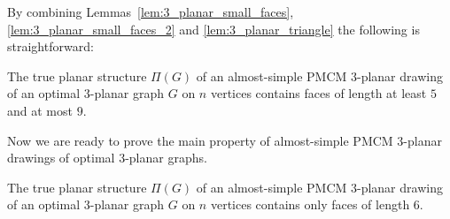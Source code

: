 By combining Lemmas~\ref{lem:3_planar_small_faces}, \ref{lem:3_planar_small_faces_2} and \ref{lem:3_planar_triangle} the following is straightforward:
 
\begin{corollary}\label{cor:3_planar_faces_general}
The true planar structure $\Pi(G)$ of an almost-simple PMCM $3$-planar drawing of an optimal $3$-planar graph $G$ on $n$ vertices contains faces of length at least $5$ and at most $9$.
\end{corollary}

 
 Now we are ready to prove the main property of almost-simple PMCM $3$-planar drawings of optimal $3$-planar graphs.
 
 \begin{lemma}\label{lem:3_planar_faces_final}
  The true planar structure $\Pi(G)$ of an almost-simple PMCM $3$-planar drawing of an optimal $3$-planar graph $G$ on $n$ vertices contains only faces of length $6$.
 \end{lemma}

